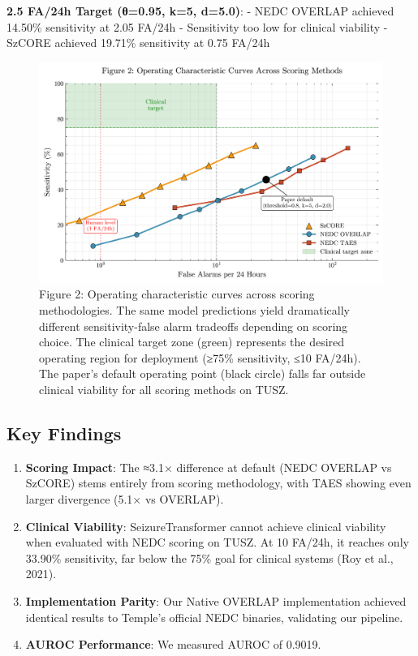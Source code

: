\documentclass[
  10pt,
]{article}
\begin{document}
\textbf{2.5 FA/24h Target (θ=0.95, k=5, d=5.0)}: - NEDC OVERLAP achieved
14.50\% sensitivity at 2.05 FA/24h - Sensitivity too low for clinical
viability - SzCORE achieved 19.71\% sensitivity at 0.75 FA/24h

\begin{figure}
\hypertarget{fig:operating-curves}{%
\centering
\includegraphics[width=1\textwidth,height=\textheight]{figures/fig2_operating_curves.png}
\caption{Figure 2: Operating characteristic curves across scoring
methodologies. The same model predictions yield dramatically different
sensitivity-false alarm tradeoffs depending on scoring choice. The
clinical target zone (green) represents the desired operating region for
deployment (≥75\% sensitivity, ≤10 FA/24h). The paper's default
operating point (black circle) falls far outside clinical viability for
all scoring methods on TUSZ.}\label{fig:operating-curves}
}
\end{figure}

\hypertarget{key-findings}{%
\subsection{Key Findings}\label{key-findings}}

\begin{enumerate}
\def\labelenumi{\arabic{enumi}.}
\item
  \textbf{Scoring Impact}: The ≈3.1× difference at default (NEDC OVERLAP
  vs SzCORE) stems entirely from scoring methodology, with TAES showing
  even larger divergence (5.1× vs OVERLAP).
\item
  \textbf{Clinical Viability}: SeizureTransformer cannot achieve
  clinical viability when evaluated with NEDC scoring on TUSZ. At 10
  FA/24h, it reaches only 33.90\% sensitivity, far below the 75\% goal
  for clinical systems (Roy et al., 2021).
\item
  \textbf{Implementation Parity}: Our Native OVERLAP implementation
  achieved identical results to Temple's official NEDC binaries,
  validating our pipeline.
\item
  \textbf{AUROC Performance}: We measured AUROC of 0.9019.
\end{enumerate}
\end{document}
